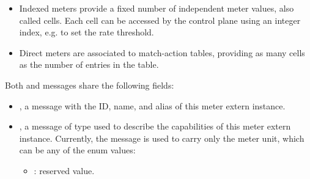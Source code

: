 \documentclass[11pt]{article}
\begin{document}
{%
\begin{itemize}%

\item{}
Indexed meters provide a fixed number of independent meter values, also called
cells. Each cell can be accessed by the control plane using an integer index,
e.g. to set the rate threshold.%

\item{}
Direct meters are associated to match-action tables, providing as many cells
as the number of entries in the table.%
\end{itemize}%

\noindent{}Both  and  messages share the following fields:%

\begin{itemize}%

\item{}
, a  message with the ID, name, and alias of this meter
extern instance.%

\item{}
, a message of type  used to describe the capabilities of
this meter extern instance. Currently, the  message is used to
carry only the meter unit, which can be any of the  enum
values:%

\begin{itemize}[noitemsep,topsep=\mdcompacttopsep]%

\item{}: reserved value.%


\end{itemize}
\end{itemize}}
\end{document}
